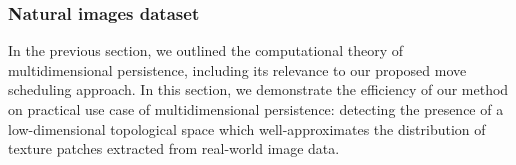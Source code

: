\documentclass{siamart190516}
\begin{document}



 
 \subsubsection*{Natural images dataset} 
 In the previous section, we outlined the computational theory of multidimensional persistence, including its relevance to our proposed move scheduling approach. In this section, we demonstrate the efficiency of our method on practical use case of multidimensional persistence: detecting the presence of a low-dimensional topological space which well-approximates the distribution of texture patches extracted from real-world image data. 
 
\end{document}
